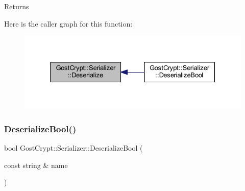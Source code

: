 \begin{DoxyReturn}{Returns}

\end{DoxyReturn}
Here is the caller graph for this function\+:
\nopagebreak
\begin{figure}[H]
\begin{center}
\leavevmode
\includegraphics[width=330pt]{class_gost_crypt_1_1_serializer_aa9128b0f1fba82a15f03863cee1f8a40_icgraph}
\end{center}
\end{figure}
\mbox{\label{class_gost_crypt_1_1_serializer_af393b082b53d0e44b2f53be8e02f68ba}} 
\subsubsection{\texorpdfstring{Deserialize\+Bool()}{DeserializeBool()}}
{\footnotesize\ttfamily bool Gost\+Crypt\+::\+Serializer\+::\+Deserialize\+Bool (\begin{DoxyParamCaption}\item[{const string \&}]{name }\end{DoxyParamCaption})}



